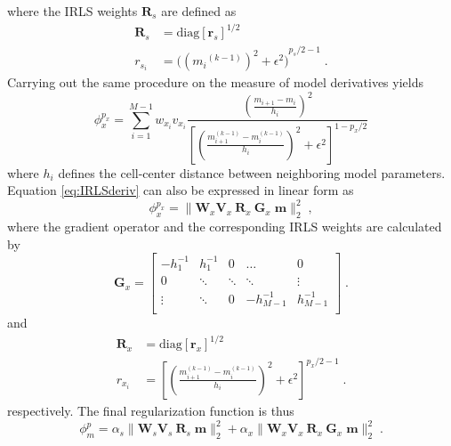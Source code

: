 where the IRLS weights $\mathbf{R}_s$ are defined as
\begin{equation}\label{eq:R_w}
\begin{split}
	\mathbf{R}_s &= \text{diag} \left[\mathbf{r}_s \right]^{1/2} \\
	r_{s_i} &= {\Big( {({m_i}^{(k-1)})}^{2} + \epsilon^2 \Big)}^{p_s/2 - 1}\;.
\end{split}
\end{equation}
Carrying out the same procedure on the measure of model derivatives yields
\begin{equation} \label{eq:IRLSderiv}
\phi_x^{p_x} = \sum_{i=1}^{M-1}w_{x_i} v_{x_i} \frac{ \left(\frac{m_{i+1} - m_i}{h_i}\right)^2}{{{\left[\left(\frac{m^{(k-1)}_{i+1} - m^{(k-1)}_i}{h_i}\right)^{2} +\epsilon^2 \right]}^{1-p_x/2}} }
\end{equation}
where $h_i$ defines the cell-center distance between neighboring model parameters. Equation \eqref{eq:IRLSderiv} can also be expressed in linear form as
\begin{equation}\label{phixMatrix}
\phi_x^{p_x} = \| \mathbf{W}_x \mathbf{V}_x\:\mathbf{R}_x\:\mathbf{G}_x\;\mathbf{m} \|_2^2\;,
\end{equation}
where the gradient operator and the corresponding IRLS weights are calculated by
\begin{equation}\label{1D_Grad}
\mathbf{G}_x =
		\begin{bmatrix}
			-h_1^{-1}		& 		h_1^{-1}	& 	0		& \dots 		& 0 \\
			0 		& 	\ddots	& 	 \ddots	& \ddots 	& \vdots \\
			\vdots	& 		 \ddots	& 0	& -h^{-1}_{{M-1}} & h^{-1}_{{M-1}}\\
		 \end{bmatrix}\;.
\end{equation}
and
\begin{equation}\label{eq:Rx_w}
\begin{split}
	\mathbf{R}_x &=  \text{diag} \left[\mathbf{r}_x \right]^{1/2} \\
	r_{x_i} &=\left[ \left(\frac{m^{(k-1)}_{i+1} - m^{(k-1)}_i}{h_i}\right)^{2} + \epsilon^2\right]^{p_x/2 - 1}\;.
\end{split}
\end{equation}
respectively. The final regularization function is thus
\begin{equation}\label{IRLSobjFun}
\phi_m^p =\alpha_s \|\mathbf{W}_s \mathbf{V}_s\:\mathbf{R}_s\;\mathbf{m}\|_2^2 + \alpha_x\|\mathbf{W}_x\mathbf{V}_x\:\mathbf{R}_x\:\mathbf{G}_x\;\mathbf{m}\|_2^2 \;.
\end{equation}
